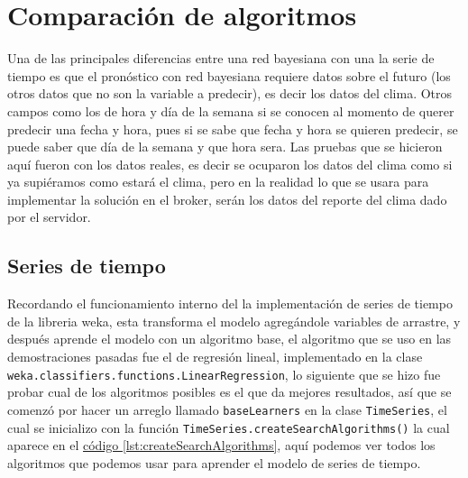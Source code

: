 \section{Comparación de algoritmos} \label{sec:comparacion}
Una de las principales diferencias entre una red bayesiana con una la serie de tiempo es que el pronóstico con red bayesiana requiere datos sobre el futuro (los otros datos que no son la variable a predecir), es decir los datos del clima. Otros campos como los de hora y día de la semana si se conocen al momento de querer predecir una fecha y hora, pues si se sabe que fecha y hora se quieren predecir, se puede saber que día de la semana y que hora sera.
Las pruebas que se hicieron aquí fueron con los datos reales, es decir se ocuparon los datos del clima como si ya supiéramos como estará el clima, pero en la realidad lo que se usara para implementar la solución en el broker, serán los datos del reporte del clima dado por el servidor.

\subsection{Series de tiempo} \label{subsec:compSeries}
Recordando el funcionamiento interno del la implementación de series de tiempo de la libreria weka, esta transforma el modelo agregándole variables de arrastre, y después aprende el modelo con un algoritmo base, el algoritmo que se uso en las demostraciones pasadas fue el de regresión lineal, implementado en la clase 
\texttt{weka.classifiers.functions.LinearRegression}, lo siguiente que se hizo fue probar cual de los algoritmos posibles es el que da mejores resultados, así que se comenzó por hacer un arreglo llamado \texttt{baseLearners} en la clase \texttt{TimeSeries}, el cual se inicializo con la función \texttt{TimeSeries.createSearchAlgorithms()} la cual aparece en el 
\hyperref[lst:createSearchAlgorithms]{ código \ref{lst:createSearchAlgorithms}}, aquí podemos ver todos los algoritmos que podemos usar para aprender el modelo de series de tiempo. %


